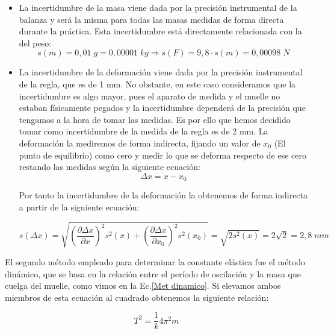 \documentclass[a4paper,12pt,titlepage]{report}
\begin{document}
\begin{itemize}
    \item La incertidumbre de la masa viene dada por la precisión instrumental de la balanza y será la misma para todas las masas medidas de forma directa durante la práctica. Esta incertidumbre está directamente relacionada con la del peso:
    \begin{equation}
        s(m) = 0,01 \; g = 0,00001 \; kg \Rightarrow s(F) =9,8\cdot s(m) = 0,00098 \; N
        \label{Inc peso}
    \end{equation}
    \item La incertidumbre de la deformación viene dada por la precisión instrumental de la regla, que es de 1 mm. No obstante, en este caso consideramos que la incertidumbre es algo mayor, pues el aparato de medida y el muelle no estaban físicamente pegados y la incertidumbre dependerá de la precisión que tengamos a la hora de tomar las medidas. Es por ello que hemos decidido tomar como incertidumbre de la medida de la regla es de 2 mm. La deformación la mediremos de forma indirecta, fijando un valor de $x_0$ (El punto de equilibrio) como cero y medir lo que se deforma respecto de ese cero restando las medidas según la siguiente ecuación:
    \begin{equation}
        \Delta x = x - x_0
        \label{Deformación}
    \end{equation}

    Por tanto la incertidumbre de la deformación la obtenemos de forma indirecta a partir de la siguiente ecuación:

    \begin{equation}
        s(\Delta x) = \sqrt{\left (\frac{\partial \Delta x}{\partial x}\right )^2s^2(x) + \left (\frac{\partial \Delta x}{\partial x_0}\right )^2s^2(x_0)} = \sqrt{2s^2(x)} = 2\sqrt{2} = 2,8 \; mm
        \label{Inc deformacion}
    \end{equation}
\end{itemize}

El segundo método empleado para determinar la constante elástica fue el método dinámico, que se basa en la relación entre el período de oscilación y la masa que cuelga del muelle, como vimos en la Ec.\ref{Met dinamico}. Si elevamos ambos miembros de esta ecuación al cuadrado obtenemos la siguiente relación:

\begin{equation}
    T^2 = \frac{1}{k} 4 \pi^2 m
\end{equation}
\end{document}
